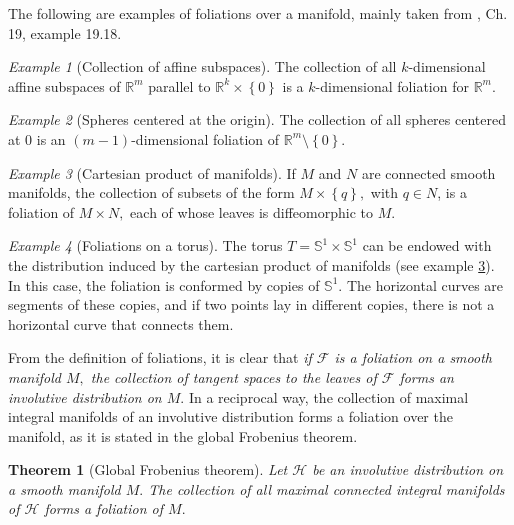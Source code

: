 \documentclass[12pt, letterpaper, reqno]{amsart}
\theoremstyle{definition}
\theoremstyle{plain}
\newtheorem{thm}{Theorem}
\theoremstyle{remark}
\newtheorem{ex}{Example}
\begin{document}
The following are examples of foliations over a manifold, mainly taken from \cite{lee2003introduction}, Ch. 19, example 19.18.

\begin{ex}[Collection of affine subspaces]
	The collection of all $ k $-dimensional affine subspaces of $ \mathbb{R}^m $ parallel to $ \mathbb{R}^k\times \left\{ 0 \right\} $ is a $ k $-dimensional foliation for $ \mathbb{R}^m. $ 
\end{ex}

\begin{ex}[Spheres centered at the origin]
	The collection of all spheres centered at $ 0 $ is an $ (m-1) $-dimensional foliation of $ \mathbb{R}^m\setminus \left\{ 0 \right\} $. 
\end{ex}

\begin{ex}[Cartesian product of manifolds]\label{ex:product_foliation}
	If $ M $ and $ N $ are connected smooth manifolds, the collection of subsets of the form $ M\times \left\{ q \right\}, $ with $ q\in N $, is a foliation of $ M\times N, $ each of whose leaves is diffeomorphic to $ M. $  	
\end{ex}

\begin{ex}[Foliations on a torus]
	The torus $ T= \mathbb{S}^1\times \mathbb{S}^1 $ can be endowed with the distribution induced by the cartesian product of manifolds (see example \ref{ex:product_foliation}). In this case, the foliation is conformed by copies of $ \mathbb{S}^1. $ The horizontal curves are segments of these copies, and if two points lay in different copies, there is not a horizontal curve that connects them.
\end{ex}

From the definition of foliations, it is clear that \textit{if $ \mathcal{F} $ is a foliation on a smooth manifold $ M, $ the collection of tangent spaces to the leaves of $ \mathcal{F} $ forms an involutive distribution on $ M. $} In a reciprocal way, the collection of maximal integral manifolds of an involutive distribution forms a foliation over the manifold, as it is stated in the global Frobenius theorem.

\begin{thm}[Global Frobenius theorem]
	Let $ \mathcal{H} $ be an involutive distribution on a smooth manifold $ M. $ The collection of all maximal connected integral manifolds of $ \mathcal{H} $ forms a foliation of $ M. $ 
\end{thm}
\end{document}
